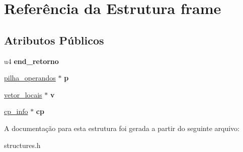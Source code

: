 \hypertarget{structframe}{}\section{Referência da Estrutura frame}
\label{structframe}
\subsection*{Atributos Públicos}
\begin{DoxyCompactItemize}
\item 
\mbox{\label{structframe_a5d2f3ff696847f4147ff799395a331fc}} 
u4 {\bfseries end\+\_\+retorno}
\item 
\mbox{\label{structframe_a6aa3e7c39989aa1477fd946643f521fe}} 
\hyperlink{structpilha__operandos}{pilha\+\_\+operandos} $\ast$ {\bfseries p}
\item 
\mbox{\label{structframe_a01ae11b1517de21c420c3c9a6a267401}} 
\hyperlink{structvetor__locais}{vetor\+\_\+locais} $\ast$ {\bfseries v}
\item 
\mbox{\label{structframe_a93acb5bd67bf7dbfd2605c2d5c4c76c5}} 
\hyperlink{structcp__info}{cp\+\_\+info} $\ast$ {\bfseries cp}
\end{DoxyCompactItemize}


A documentação para esta estrutura foi gerada a partir do seguinte arquivo\+:\begin{DoxyCompactItemize}
\item 
structures.\+h\end{DoxyCompactItemize}
